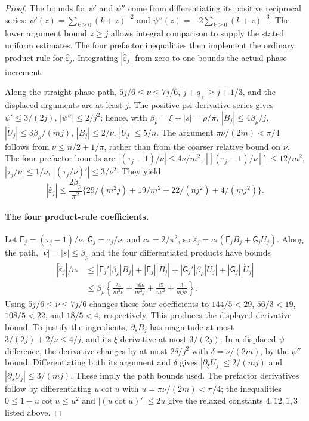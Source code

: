 \begin{proof}
The bounds for $\psi'$ and $\psi''$ come from differentiating its
positive reciprocal series:
$\psi'(z)=\sum_{k\geq0}(k+z)^{-2}$ and
$\psi''(z)=-2\sum_{k\geq0}(k+z)^{-3}$. The lower argument bound
$z\geq j$ allows integral comparison to supply the stated uniform
estimates. The four prefactor inequalities then implement the ordinary
product rule for $\widehat\varepsilon_j$. Integrating $|\dot{\widehat\varepsilon}_j|$ from zero to one
bounds the actual phase increment.

Along the straight phase path, $5j/6\leq\nu\leq7j/6$,
$j+q_\pm\geq j+1/3$, and the displaced arguments are at least $j$.
The positive psi derivative series gives
$\psi'\leq3/(2j)$, $|\psi''|\leq2/j^2$; hence, with
$\beta_\rho=\xi+|s|=\rho/\pi$, $|\dot B_j|\leq4\beta_\rho/j$, $|\dot U_j|\leq3\beta_\rho/(mj)$,
$|B_j|\leq2/\nu$, $|U_j|\leq5/n$.
The argument $\pi\nu/(2m)<\pi/4$ follows from
$\nu\leq n/2+1/\pi$, rather than from the coarser relative bound on $\nu$.
The four prefactor bounds are
$|({\tau_j-1})/\nu|\leq4\nu/m^2$,
$|[({\tau_j-1})/\nu]'|\leq12/m^2$,
$|\tau_j/\nu|\leq1/\nu$, $|(\tau_j/\nu)'|\leq3/\nu^2$.
They yield
\[
 |\dot{\widehat\varepsilon}_j|\leq\frac{2\beta_\rho}{\pi^2}
 \{29/(m^2j)+19/m^2+22/(nj^2)+4/(mj^2)\}.
\]
\paragraph{The four product-rule coefficients.}
Let $\mathsf F_j=(\tau_j-1)/\nu$, $\mathsf G_j=\tau_j/\nu$, and
$c_*=2/\pi^2$, so $\widehat\varepsilon_j=c_*(\mathsf F_jB_j+\mathsf G_jU_j)$. Along the path,
$|\dot\nu|=|s|\leq \beta_\rho$ and the four differentiated products have
bounds
\[
 \begin{aligned}
 |\dot{\widehat\varepsilon}_j|/c_*
 &\leq |\mathsf F_j'|\beta_\rho|B_j|+|\mathsf F_j||\dot B_j|
                  +|\mathsf G_j'|\beta_\rho|U_j|+|\mathsf G_j||\dot U_j|\\
 &\leq \beta_\rho\left\{\frac{24}{m^2\nu}+\frac{16\nu}{m^2j}
                 +\frac{15}{n\nu^2}+\frac3{mj\nu}\right\}.
 \end{aligned}
\]
Using $5j/6\leq\nu\leq7j/6$ changes these four coefficients to
$144/5<29$, $56/3<19$, $108/5<22$, and $18/5<4$,
respectively. This produces the displayed derivative bound.
To justify the ingredients, $\partial_s B_j$ has magnitude at most
$3/(2j)+2/\nu\leq4/j$, and its $\xi$ derivative at most
$3/(2j)$. In a displaced $\psi$ difference, the derivative changes
by at most $2\delta/j^2$ with $\delta=\nu/(2m)$, by the
$\psi''$ bound. Differentiating both its argument and $\delta$
gives $|\partial_\xi U_j|\leq2/(mj)$ and
$|\partial_s U_j|\leq3/(mj)$. These imply the path bounds used.
The prefactor derivatives follow by differentiating $u\cot u$ with
$u=\pi\nu/(2m)<\pi/4$; the inequalities
$0\leq1-u\cot u\leq u^2$ and $|(u\cot u)'|\leq2u$
give the relaxed constants $4,12,1,3$ listed above.


\end{proof}
